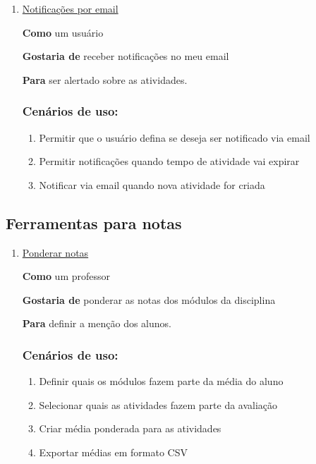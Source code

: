 \begin{enumerate}
\item \underline{Notificações por email}

\textbf{Como} um usuário

\textbf{Gostaria de} receber notificações no meu email

\textbf{Para} ser alertado sobre as atividades.

\subsubsection*{Cenários de uso:}
  \begin{enumerate}
  \item Permitir que o usuário defina se deseja ser notificado via email
  \item Permitir notificações quando tempo de atividade vai expirar
  \item Notificar via email quando nova atividade for criada
  \end{enumerate}
\end{enumerate}

\subsection*{Ferramentas para notas}

\begin{enumerate}
\item \underline{Ponderar notas}

\textbf{Como} um professor

\textbf{Gostaria de} ponderar as notas dos módulos da disciplina

\textbf{Para} definir a menção dos alunos.

\subsubsection*{Cenários de uso:}
  \begin{enumerate}
  \item Definir quais os módulos fazem parte da média do aluno
  \item Selecionar quais as atividades fazem parte da avaliação
  \item Criar média ponderada para as atividades
  \item Exportar médias em formato CSV
  \end{enumerate}
\end{enumerate}
